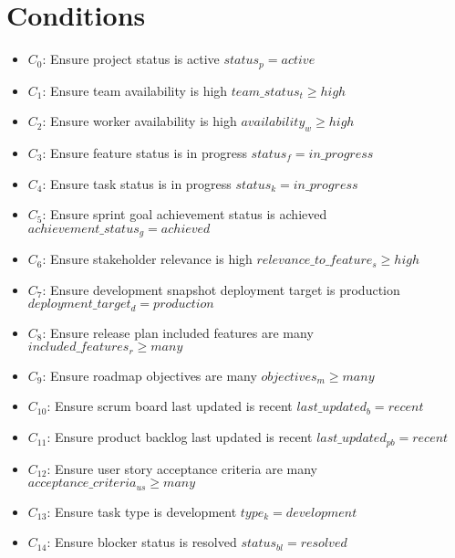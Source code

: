 \documentclass{article}
\begin{document}
\section{Conditions}
\begin{itemize}
    \item $C_0$: Ensure project status is active $status_p = active$
    \item $C_1$: Ensure team availability is high $team\_status_t \geq high$
    \item $C_2$: Ensure worker availability is high $availability_w \geq high$
    \item $C_3$: Ensure feature status is in progress $status_f = in\_progress$
    \item $C_4$: Ensure task status is in progress $status_k = in\_progress$
    \item $C_5$: Ensure sprint goal achievement status is achieved $achievement\_status_g = achieved$
    \item $C_6$: Ensure stakeholder relevance is high $relevance\_to\_feature_s \geq high$
    \item $C_7$: Ensure development snapshot deployment target is production $deployment\_target_d = production$
    \item $C_8$: Ensure release plan included features are many $included\_features_r \geq many$
    \item $C_9$: Ensure roadmap objectives are many $objectives_m \geq many$
    \item $C_{10}$: Ensure scrum board last updated is recent $last\_updated_b = recent$
    \item $C_{11}$: Ensure product backlog last updated is recent $last\_updated_{pb} = recent$
    \item $C_{12}$: Ensure user story acceptance criteria are many $acceptance\_criteria_{us} \geq many$
    \item $C_{13}$: Ensure task type is development $type_k = development$
    \item $C_{14}$: Ensure blocker status is resolved $status_{bl} = resolved$
\end{itemize}
\end{document}
